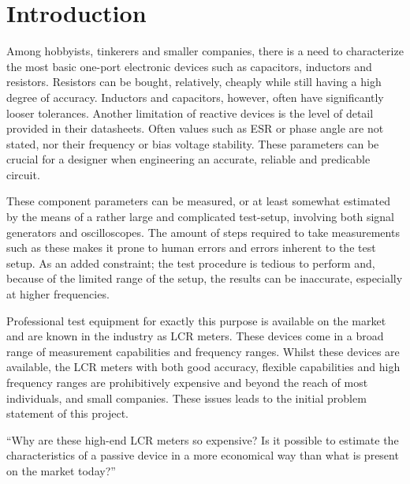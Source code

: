 \chapter{Introduction} \label{ch:Introduction}
Among hobbyists, tinkerers and smaller companies, there is a need to characterize the most basic one-port electronic devices such as capacitors, inductors and resistors. Resistors can be bought, relatively, cheaply while still having a high degree of accuracy. Inductors and capacitors, however, often have significantly looser tolerances. Another limitation of reactive devices is the level of detail provided in their datasheets. Often values such as ESR or phase angle are not stated, nor their frequency or bias voltage stability. These parameters can be crucial for a designer when engineering an accurate, reliable and predicable circuit.

These component parameters can be measured, or at least somewhat estimated by the means of a rather large and complicated test-setup, involving both signal generators and oscilloscopes. The amount of steps required to take measurements such as these makes it prone to human errors and errors inherent to the test setup. As an added constraint; the test procedure is tedious to perform and, because of the limited range of the setup, the results can be inaccurate, especially at higher frequencies.

Professional test equipment for exactly this purpose is available on the market and are known in the industry as LCR meters. These devices come in a broad range of measurement capabilities and frequency ranges. Whilst these devices are available, the LCR meters with both good accuracy, flexible capabilities and high frequency ranges are prohibitively expensive and beyond the reach of most individuals, and small companies. These issues leads to the initial problem statement of this project.

“Why are these high-end LCR meters so expensive? Is it possible to estimate the characteristics of a passive device in a more economical way than what is present on the market today?”
